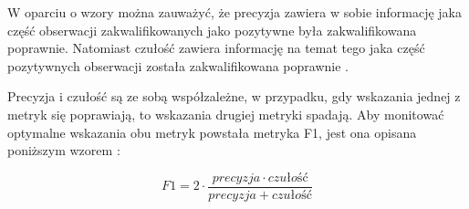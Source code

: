 W oparciu o wzory można zauważyć, że precyzja zawiera w sobie informację jaka część obserwacji zakwalifikowanych jako pozytywne była zakwalifikowana poprawnie. Natomiast czułość zawiera informację na temat tego jaka część pozytywnych obserwacji została zakwalifikowana poprawnie \cite{metryki_1}.

Precyzja i czułość są ze sobą współzależne, w przypadku, gdy wskazania jednej z metryk się poprawiają, to wskazania drugiej metryki spadają. Aby monitować optymalne wskazania obu metryk powstała metryka F1, jest ona opisana poniższym wzorem \cite{metryki_2}:

$$
    F1 = 2 \cdot \frac{precyzja \cdot czułość}{precyzja + czułość}
$$








